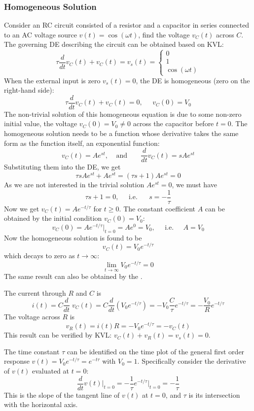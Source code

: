 \subsubsection*{Homogeneous Solution}


Consider an RC circuit consisted of a resistor and a capacitor in series 
connected to an AC voltage source $v(t)=\cos(\omega t)$, find the voltage
$v_C(t)$ across $C$. The governing DE describing the circuit can be obtained 
based on KVL:
\[
\tau\frac{d}{dt}v_C(t)+v_C(t)=v_s(t)
=\left\{\begin{array}{c}0\\1\\\cos(\omega t)\end{array}\right.
\]
When the external input is zero $v_s(t)=0$, the DE is homogeneous (zero 
on the right-hand side):
\[
\tau\frac{d}{dt}v_C(t)+v_C(t)=0,\;\;\;\;\;v_C(0)=V_0
\]
The non-trivial solution of this homogeneous equation is due to some 
non-zero initial value, the voltage $v_C(0)=V_0\ne 0$ across the capacitor
before $t=0$. The homogeneous solution needs to be a function whose 
derivative takes the same form as the function itself, an exponential
function:
\[
v_C(t)=A e^{st},\;\;\;\;\mbox{and}\;\;\;\;\;\;\;\frac{d}{dt}v_C(t)=s A e^{st}
\]
Substituting them into the DE, we get
\[
\tau sA e^{st} + Ae^{st}=(\tau s+1) Ae^{st}=0 
\]
As we are not interested in the trivial solution $Ae^{st}=0$, we must 
have
\[ 
\tau s+1=0,\;\;\;\;\;\mbox{i.e.}\;\;\;\;\;\;s=-\frac{1}{\tau} 
\]
Now we get $v_C(t)=Ae^{-t/\tau}$ for $t\ge 0$. The constant coefficient 
$A$ can be obtained by the initial condition $v_C(0)=V_0$:
\[ 
v_C(0)=A e^{-t/\tau}\bigg|_{t=0}=A e^{0}=V_0,
\;\;\;\;\;\mbox{i.e.}\;\;\;\;\;A=V_0	
\]
Now the homogeneous solution is found to be
\[
v_C(t)=V_0 e^{-t/\tau}		
\]
which decays to zero as $t\rightarrow\infty$:
\[
\lim_{t\rightarrow\infty} V_0 e^{-t/\tau}=0
\]
The same result can also be obtained by the
.

The current through $R$ and $C$ is
\[
i(t)=C\frac{d}{dt}\;v_C(t)=C\frac{d}{dt}\left(V_0 e^{-t/\tau}\right)
=-V_0 \frac{C}{\tau} e^{-t/\tau}=-\frac{V_0}{R} e^{-t/\tau}	
\]
The voltage across $R$ is 
\[
v_R(t)=i(t)R=-V_0 e^{-t/\tau}=-v_C(t)	
\]
This result can be verified by KVL: $v_C(t)+v_R(t)=v_s(t)=0$.

The time constant $\tau$ can be identified on the time plot of the general
first order response $v(t)=V_0 e^{-t/\tau}=e^{-t\tau}$ with $V_0=1$. Specifically
consider the derivative of $v(t)$ evaluated at $t=0$:
\[
\frac{d}{dt}v(t)\big|_{t=0}=-\frac{1}{\tau}e^{-t/\tau}\bigg|_{t=0}=-\frac{1}{\tau}
\]
This is the slope of the tangent line of $v(t)$ at $t=0$, and $\tau$ is its
intersection with the horizontal axis.

